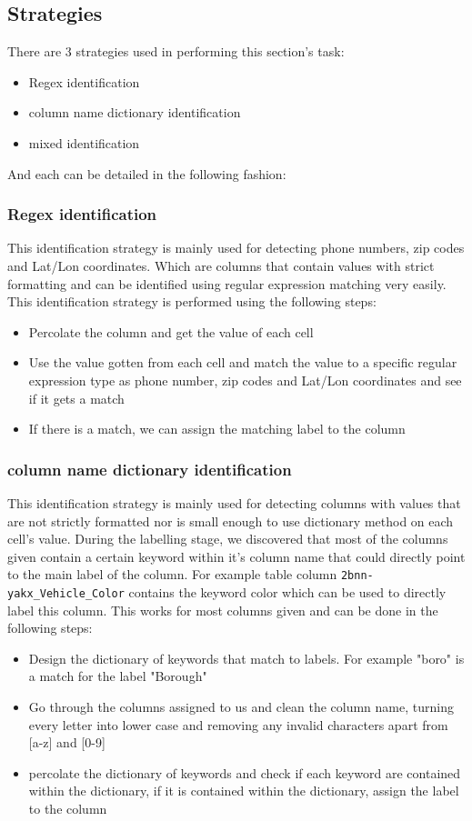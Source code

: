\documentclass[sigconf]{acmart}
\begin{document}
\subsection{Strategies}
There are 3 strategies used in performing this section's task:
\begin{itemize}
\item Regex identification
\item column name dictionary identification
\item mixed identification
\end{itemize}
And each can be detailed in the following fashion:
\subsubsection{Regex identification}
This identification strategy is mainly used for detecting phone numbers, zip codes and Lat/Lon coordinates. Which are columns that contain values with strict formatting and can be identified using regular expression matching very easily. This identification strategy is performed using the following steps:
\begin{itemize}
\item Percolate the column and get the value of each cell
\item Use the value gotten from each cell and match the value to a specific regular expression type as phone number, zip codes and Lat/Lon coordinates and see if it gets a match  
\item If there is a match, we can assign the matching label to the column
\end{itemize}
\subsubsection{column name dictionary identification}
This identification strategy is mainly used for detecting columns with values that are not strictly formatted nor is small enough to use dictionary method on each cell's value. During the labelling stage, we discovered that most of the columns given contain a certain keyword within it's column name that could directly point to the main label of the column. For example table column \verb|2bnn-yakx_Vehicle_Color| contains the keyword color which can be used to directly label this column. This works for most columns given and can be done in the following steps:
\begin{itemize}
\item Design the dictionary of keywords that match to labels. For example "boro" is a match for the label "Borough"
\item Go through the columns assigned to us and clean the column name, turning every letter into lower case and removing any invalid characters apart from [a-z] and [0-9]
\item percolate the dictionary of keywords and check if each keyword are contained within the dictionary, if it is contained within the dictionary, assign the label to the column
\end{itemize}
\end{document}
